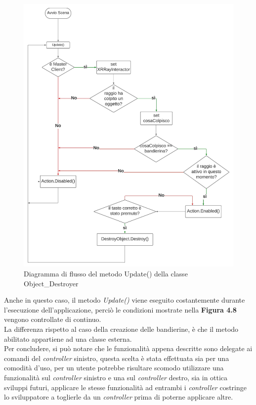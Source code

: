 \begin{figure}[H]
    \centering
    \includegraphics[scale = 0.45]{Immagini/ObjectDestroyer().jpg}
    \caption{Diagramma di flusso del metodo Update() della classe Object\_Destroyer}
    \label{fig:my_label}
\end{figure}
\hspace{-0.6cm}Anche in questo caso, il metodo \textit{Update()} viene eseguito costantemente durante l'esecuzione dell'applicazione, perciò le condizioni mostrate nella \textbf{Figura 4.8} vengono controllate di continuo.
\\La differenza rispetto al caso della creazione delle bandierine, è che il metodo abilitato appartiene ad una classe esterna.
\\Per concludere, si può notare che le funzionalità appena descritte sono delegate ai comandi del \textit{controller} sinistro, questa scelta è stata effettuata sia per una comodità d'uso, per un utente potrebbe risultare scomodo utilizzare una funzionalità sul \textit{controller} sinistro e una sul \textit{controller} destro, sia in ottica sviluppi futuri, applicare le stesse funzionalità ad entrambi i \textit{controller} costringe lo sviluppatore a toglierle da un \textit{controller} prima di poterne applicare altre.
